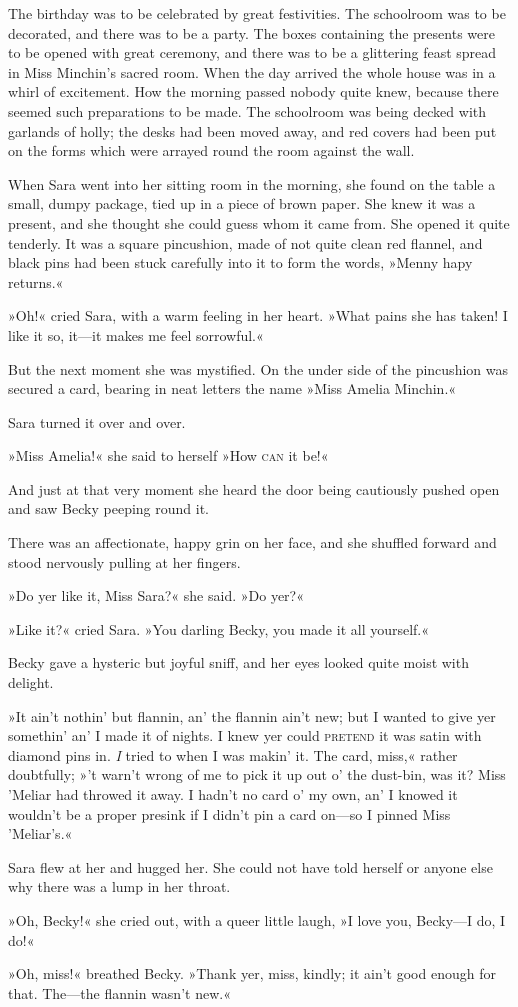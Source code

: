The birthday was to be celebrated by great festivities. The schoolroom was to be decorated, and there was to be a party. The boxes containing the presents were to be opened with great ceremony, and there was to be a glittering feast spread in Miss Minchin's sacred room. When the day arrived the whole house was in a whirl of excitement. How the morning passed nobody quite knew, because there seemed such preparations to be made. The schoolroom was being decked with garlands of holly; the desks had been moved away, and red covers had been put on the forms which were arrayed round the room against the wall.

When Sara went into her sitting room in the morning, she found on the table a small, dumpy package, tied up in a piece of brown paper. She knew it was a present, and she thought she could guess whom it came from. She opened it quite tenderly. It was a square pincushion, made of not quite clean red flannel, and black pins had been stuck carefully into it to form the words, »Menny hapy returns.«

»Oh!« cried Sara, with a warm feeling in her heart. »What pains she has taken! I like it so, it—it makes me feel sorrowful.«

But the next moment she was mystified. On the under side of the pincushion was secured a card, bearing in neat letters the name »Miss Amelia Minchin.«

Sara turned it over and over.

»Miss Amelia!« she said to herself »How \textsc{can} it be!«

And just at that very moment she heard the door being cautiously pushed open and saw Becky peeping round it.

There was an affectionate, happy grin on her face, and she shuffled forward and stood nervously pulling at her fingers.

»Do yer like it, Miss Sara?« she said. »Do yer?«

»Like it?« cried Sara. »You darling Becky, you made it all yourself.«

Becky gave a hysteric but joyful sniff, and her eyes looked quite moist with delight.

»It ain't nothin' but flannin, an' the flannin ain't new; but I wanted to give yer somethin' an' I made it of nights. I knew yer could \textsc{pretend} it was satin with diamond pins in. \textit{I} tried to when I was makin' it. The card, miss,« rather doubtfully; »'t warn't wrong of me to pick it up out o' the dust-bin, was it? Miss 'Meliar had throwed it away. I hadn't no card o' my own, an' I knowed it wouldn't be a proper presink if I didn't pin a card on—so I pinned Miss 'Meliar's.«

Sara flew at her and hugged her. She could not have told herself or anyone else why there was a lump in her throat.

»Oh, Becky!« she cried out, with a queer little laugh, »I love you, Becky—I do, I do!«

»Oh, miss!« breathed Becky. »Thank yer, miss, kindly; it ain't good enough for that. The—the flannin wasn't new.«